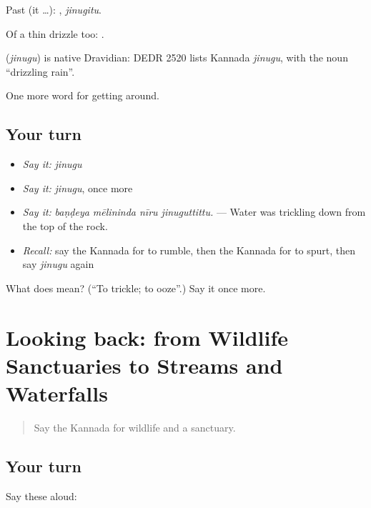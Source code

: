 Past (it …): , \emph{jinugitu}.

Of a thin drizzle too:  .

\begin{cousinweb}
\textbf{} (\emph{jinugu}) is native Dravidian: DEDR 2520 lists Kannada \emph{jinugu}, with the noun \textquotedblleft{}drizzling rain\textquotedblright{}.
\end{cousinweb}

\begin{grammarlens}[title={What you've built}]
One more word for getting around.
\end{grammarlens}

\subsection*{Your turn}
\begin{itemize}
\raggedright
  \item \emph{Say it:} \emph{jinugu}
  \item \emph{Say it:} \emph{jinugu}, once more
  \item \emph{Say it:} \emph{baṇḍeya mēlininda nīru jinuguttittu.} — Water was trickling down from the top of the rock.
  \item \emph{Recall:} say the Kannada for to rumble, then the Kannada for to spurt, then say \emph{jinugu} again
\end{itemize}

\begin{tcolorbox}[breakable,colback=teal!4,colframe=teal!35!black,title={Before you move on}]
What does  mean? (\textquotedblleft{}To trickle; to ooze\textquotedblright{}.) Say it once more.
\end{tcolorbox}
\section[(dialogue)]{Looking back: from Wildlife Sanctuaries to Streams and Waterfalls}

\label{lesson:KA-R482-review-476-482}



\begin{quote}
Say the Kannada for wildlife and a sanctuary.
\end{quote}

\subsection*{Your turn}
Say these aloud:

